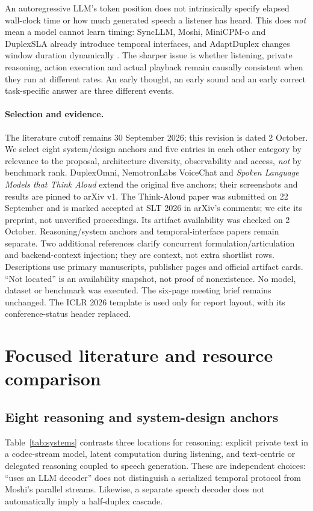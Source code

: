 \documentclass{article}
\begin{document}
An autoregressive LLM's token position does not intrinsically specify elapsed wall-clock time or how much generated speech a listener has heard. This does \emph{not} mean a model cannot learn timing: SyncLLM, Moshi, MiniCPM-o and DuplexSLA already introduce temporal interfaces, and AdaptDuplex changes window duration dynamically \citep{syncllm,moshi,minicpm,duplexsla,adapt}. The sharper issue is whether listening, private reasoning, action execution and actual playback remain causally consistent when they run at different rates. An early thought, an early sound and an early correct task-specific answer are three different events.

\paragraph{Selection and evidence.}
The literature cutoff remains 30 September 2026; this revision is dated 2 October. We select eight system/design anchors and five entries in each other category by relevance to the proposal, architecture diversity, observability and access, \emph{not} by benchmark rank. DuplexOmni, NemotronLabs VoiceChat and \emph{Spoken Language Models that Think Aloud} extend the original five anchors; their screenshots and results are pinned to arXiv v1. The Think-Aloud paper was submitted on 22 September and is marked accepted at SLT 2026 in arXiv's comments; we cite its preprint, not unverified proceedings. Its artifact availability was checked on 2 October. Reasoning/system anchors and temporal-interface papers remain separate. Two additional references clarify concurrent formulation/articulation and backend-context injection; they are context, not extra shortlist rows. Descriptions use primary manuscripts, publisher pages and official artifact cards. ``Not located'' is an availability snapshot, not proof of nonexistence. No model, dataset or benchmark was executed. The six-page meeting brief remains unchanged. The ICLR 2026 template is used only for report layout, with its conference-status header replaced.

\section{Focused literature and resource comparison}
\label{sec:review}
\subsection{Eight reasoning and system-design anchors}

Table~\ref{tab:systems} contrasts three locations for reasoning: explicit private text in a codec-stream model, latent computation during listening, and text-centric or delegated reasoning coupled to speech generation. These are independent choices: ``uses an LLM decoder'' does not distinguish a serialized temporal protocol from Moshi's parallel streams. Likewise, a separate speech decoder does not automatically imply a half-duplex cascade.
\end{document}

